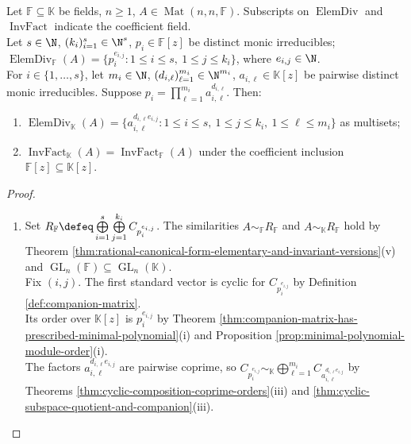 \begin{theorem} \label{thm:base-field-change-elementary-divisors} \\
Let $\mathbb{F}\subseteq\mathbb{K}$ be fields, $n\geq1$, $A\in\operatorname{Mat}(n,n,\mathbb{F})$. Subscripts on $\operatorname{ElemDiv}$ and $\operatorname{InvFact}$ indicate the coefficient field.\\
Let $s\in\N$, $(k_i)_{i=1}^s\in\N^s$, $p_i\in\mathbb{F}[z]$ be distinct monic irreducibles; $\operatorname{ElemDiv}_{\mathbb{F}}(A)=\{p_i^{e_{i,j}}:1\leq i\leq s,\ 1\leq j\leq k_i\}$, where $e_{i,j}\in\N$.\\
For $i\in\{1,\ldots,s\}$, let $m_i\in\N$, $(d_{i,\ell})_{\ell=1}^{m_i}\in\N^{m_i}$, $a_{i,\ell}\in\mathbb{K}[z]$ be pairwise distinct monic irreducibles. Suppose $p_i=\prod\limits_{\ell=1}^{m_i}a_{i,\ell}^{d_{i,\ell}}$. Then:
\begin{enumerate}[label=(\roman*)]
\setlength{\itemsep}{0pt}
\item $\operatorname{ElemDiv}_{\mathbb{K}}(A)=\{a_{i,\ell}^{d_{i,\ell}e_{i,j}}:1\leq i\leq s,\ 1\leq j\leq k_i,\ 1\leq\ell\leq m_i\}$ as multisets;
\item $\operatorname{InvFact}_{\mathbb{K}}(A)=\operatorname{InvFact}_{\mathbb{F}}(A)$ under the coefficient inclusion $\mathbb{F}[z]\subseteq\mathbb{K}[z]$.
\end{enumerate}
\begin{proof}
\begin{enumerate}[label=(\roman*)]
\setlength{\itemsep}{0pt}
\item Set $R_{\mathbb{F}}\defeq\bigoplus\limits_{i=1}^s\bigoplus\limits_{j=1}^{k_i}C_{p_i^{e_{i,j}}}$. The similarities $A\sim_{\mathbb{F}}R_{\mathbb{F}}$ and $A\sim_{\mathbb{K}}R_{\mathbb{F}}$ hold by Theorem \ref{thm:rational-canonical-form-elementary-and-invariant-versions}(v) and $\operatorname{GL}_n(\mathbb{F})\subseteq\operatorname{GL}_n(\mathbb{K})$.\\
Fix $(i,j)$. The first standard vector is cyclic for $C_{p_i^{e_{i,j}}}$ by Definition \ref{def:companion-matrix}.\\
Its order over $\mathbb{K}[z]$ is $p_i^{e_{i,j}}$ by Theorem \ref{thm:companion-matrix-has-prescribed-minimal-polynomial}(i) and Proposition \ref{prop:minimal-polynomial-module-order}(i).\\
The factors $a_{i,\ell}^{d_{i,\ell}e_{i,j}}$ are pairwise coprime, so $C_{p_i^{e_{i,j}}}\sim_{\mathbb{K}}\bigoplus\limits_{\ell=1}^{m_i}C_{a_{i,\ell}^{d_{i,\ell}e_{i,j}}}$ by Theorems \ref{thm:cyclic-composition-coprime-orders}(iii) and \ref{thm:cyclic-subspace-quotient-and-companion}(iii).\\

\end{enumerate}
\end{proof}
\end{theorem}
